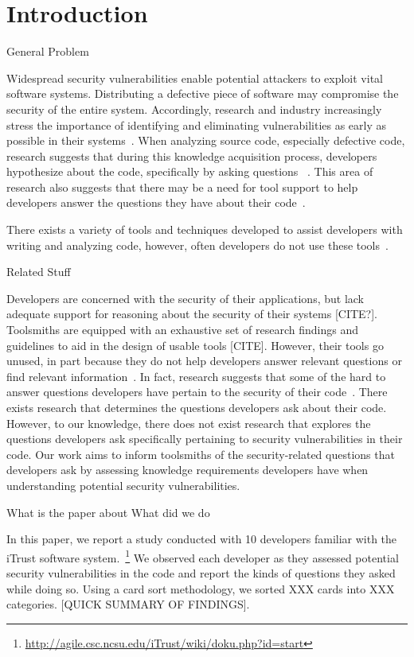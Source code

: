 \documentclass[conference]{IEEEtran}
\begin{document}
\section{Introduction}
General Problem

Widespread security vulnerabilities enable potential attackers to exploit vital software systems. 
Distributing a defective piece of software may compromise the security of the entire system. 
Accordingly, research and industry increasingly stress the importance of identifying and eliminating  vulnerabilities as early as possible in their systems~\cite{austin2011one, bessey2010few}. 
When analyzing source code, especially defective code, research suggests that during this knowledge acquisition process, developers hypothesize about the code, specifically by asking questions ~\cite{latoza2010hard, ko2004designing}. 
This area of research also suggests that there may be a need for tool support to help developers answer the questions they have about their code~\cite{latoza2010hard}. 

There exists a variety of tools and techniques developed to assist developers with writing and analyzing code, however, often developers do not use these tools~\cite{}.

Related Stuff

Developers are concerned with the security of their applications, but lack adequate support for reasoning about the security of their systems [CITE?].
Toolsmiths are equipped with an exhaustive set of research findings and guidelines to aid in the design of usable tools [CITE]. 
However, their tools go unused, in part because they do not help developers answer relevant questions or find relevant information~\cite{johnson2013don, latoza2010hard}. 
In fact, research suggests that some of the hard to answer questions developers have pertain to the security of their code~\cite{latoza2010hard}. There exists research that determines the questions developers ask about their code. 
However, to our knowledge, there does not exist research that explores the questions developers ask specifically pertaining to security vulnerabilities in their code. 
Our work aims to inform toolsmiths of the security-related questions that developers ask by assessing knowledge requirements developers have when understanding potential security vulnerabilities.


What is the paper about
	What did we do

In this paper, we report a study conducted with 10 developers familiar with the iTrust software system.~\footnote{\url{http://agile.csc.ncsu.edu/iTrust/wiki/doku.php?id=start}} We observed each developer as they assessed potential security vulnerabilities in the code and report the kinds of questions they asked while doing so. Using a card sort methodology, we sorted XXX cards into XXX categories. [QUICK SUMMARY OF FINDINGS]. 
\end{document}
